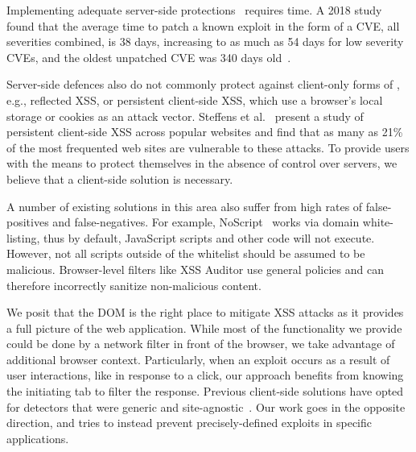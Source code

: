 Implementing adequate server-side protections~\cite{Xu:2006:TPE:1267336.1267345,DBLP:conf/sec/Nguyen-TuongGGSE05,Pietraszek:2005:DAI:2146257.2146267,Bisht:2008:XPD:1428322.1428325} requires time.
A 2018 study found that the average time to patch a known exploit in the form of a \ac{CVE}, all severities combined, is 38 days, increasing to as much as 54 days for low severity \ac{CVE}s, and the oldest unpatched \ac{CVE} was 340 days old~\cite{Rapid7}.



Server-side defences also do not commonly protect against client-only forms of
\xss, e.g., reflected \ac{XSS}, or persistent
client-side \ac{XSS}, which use a browser's local storage or cookies
as an attack vector. Steffens et
al.~\cite{DBLP:conf/ndss/SteffensRJS19} present a study of persistent
client-side \ac{XSS} across popular websites and find that as many as
21\% of the most frequented web sites are vulnerable to these attacks.
%
To provide users with the means to protect themselves in the absence
of control over servers, we believe that a client-side
solution is necessary.

A number of existing solutions in this area also suffer from high
rates of false-positives and false-negatives. %
For example, NoScript~\cite{Noscript} works via domain white-listing, thus by
default, JavaScript scripts and other code will not execute. However,
not all scripts outside of the whitelist should be assumed to be
malicious. Browser-level filters like XSS Auditor use
general policies and can therefore incorrectly sanitize non-malicious
content.

We posit that the DOM is the right place to mitigate XSS
  attacks as it provides a full picture of the web application. While
most of the functionality we provide could be done by a network filter
in front of the browser, we take advantage of additional browser context.
%
Particularly, when an exploit occurs as a result of user interactions,
like in response to a click, our approach
benefits from knowing the initiating tab to filter the
response. Previous client-side solutions have opted for detectors that were generic and site-agnostic~\cite{Kirda:2009:CCS:2639535.2639808,Jim:2007:DSI:1242572.1242654,Hallaraker:2005:DMJ:1078029.1078861}. Our work goes in the opposite direction, and tries to instead prevent precisely-defined exploits in specific applications. 

